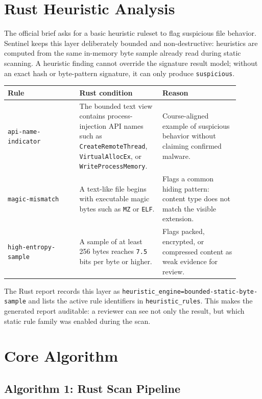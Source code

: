 \documentclass[11pt]{article}
\begin{document}
\section{Rust Heuristic Analysis}

The official brief asks for a basic heuristic ruleset to flag suspicious file
behavior. Sentinel keeps this layer deliberately bounded and non-destructive:
heuristics are computed from the same in-memory byte sample already read during
static scanning. A heuristic finding cannot override the signature result model;
without an exact hash or byte-pattern signature, it can only produce
\texttt{suspicious}.

\begin{longtable}{p{0.28\linewidth}p{0.32\linewidth}p{0.30\linewidth}}
\toprule
\textbf{Rule} & \textbf{Rust condition} & \textbf{Reason} \\
\midrule
\texttt{api-name-indicator} & The bounded text view contains process-injection
API names such as \texttt{CreateRemoteThread}, \texttt{VirtualAllocEx}, or
\texttt{WriteProcessMemory}. & Course-aligned example of suspicious behavior
without claiming confirmed malware. \\
\texttt{magic-mismatch} & A text-like file begins with executable magic bytes
such as \texttt{MZ} or \texttt{ELF}. & Flags a common hiding pattern: content
type does not match the visible extension. \\
\texttt{high-entropy-sample} & A sample of at least 256 bytes reaches
\texttt{7.5} bits per byte or higher. & Flags packed, encrypted, or compressed
content as weak evidence for review. \\
\bottomrule
\end{longtable}

The Rust report records this layer as
\texttt{heuristic\_engine=bounded-static-byte-sample} and lists the active rule
identifiers in \texttt{heuristic\_rules}. This makes the generated report
auditable: a reviewer can see not only the result, but which static rule family
was enabled during the scan.

\section{Core Algorithm}

\subsection{Algorithm 1: Rust Scan Pipeline}
\end{document}
